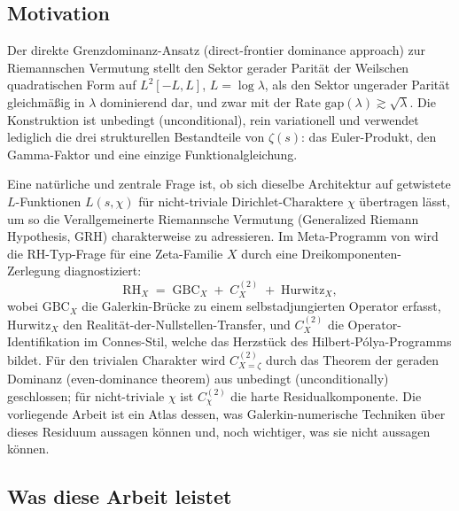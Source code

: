 \documentclass[10pt,twocolumn]{article}
\theoremstyle{definition}
\theoremstyle{remark}
\newcommand{\chifn}{\chi}
\begin{document}
\subsection{Motivation}
\label{sec:intro-motivation}

Der direkte Grenzdominanz-Ansatz (direct-frontier dominance approach) zur Riemannschen Vermutung
\cite{RH_II} stellt den Sektor gerader Parität der Weilschen quadratischen Form
auf $L^2[-L,L]$, $L=\log\lambda$, als den Sektor ungerader Parität gleichmäßig in $\lambda$ dominierend dar, und zwar
mit der Rate $\mathrm{gap}(\lambda)\gtrsim\sqrt{\lambda}$. Die Konstruktion ist
unbedingt (unconditional), rein variationell und verwendet lediglich die drei strukturellen
Bestandteile von $\zeta(s)$: das Euler-Produkt, den Gamma-Faktor und
eine einzige Funktionalgleichung.

Eine natürliche und zentrale Frage ist, ob sich dieselbe Architektur
auf getwistete $L$-Funktionen $L(s,\chi)$ für nicht-triviale
Dirichlet-Charaktere $\chi$ übertragen lässt, um so die Verallgemeinerte
Riemannsche Vermutung (Generalized Riemann Hypothesis, GRH) charakterweise zu adressieren. Im Meta-Programm
von \cite{MetaGalerkinBridge} wird die RH-Typ-Frage für eine Zeta-Familie
$X$ durch eine Dreikomponenten-Zerlegung diagnostiziert:
\begin{equation}
\label{eq:three-component}
  \mathrm{RH}_X
    \;=\;
  \mathrm{GBC}_X \;+\; C^{(2)}_X \;+\; \mathrm{Hurwitz}_X,
\end{equation}
wobei $\mathrm{GBC}_X$ die Galerkin-Brücke zu einem selbstadjungierten
Operator erfasst, $\mathrm{Hurwitz}_X$ den Realität-der-Nullstellen-Transfer, und
$C^{(2)}_X$ die Operator-Identifikation im Connes-Stil, welche das Herzstück des
Hilbert-P\'olya-Programms bildet. Für den trivialen Charakter
wird $C^{(2)}_{X=\zeta}$ durch das Theorem der geraden Dominanz (even-dominance theorem)
aus \cite{RH_II} unbedingt (unconditionally) geschlossen; für nicht-triviale $\chi$ ist $C^{(2)}_{\chifn}$ die
harte Residualkomponente. Die vorliegende Arbeit ist ein Atlas dessen, was
Galerkin-numerische Techniken über dieses Residuum aussagen können und, noch wichtiger, was
sie nicht aussagen können.

\subsection{Was diese Arbeit leistet}
\label{sec:intro-contribution}
\end{document}
